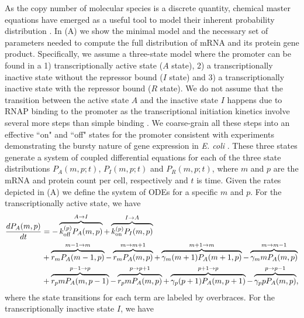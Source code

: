 As the copy number of molecular species is a discrete quantity, chemical master
equations have emerged as a useful tool to model their inherent probability
distribution \cite{Sanchez2013}. In (A) we show the
minimal model and the necessary set of parameters needed to compute the full
distribution of mRNA and its protein gene product. Specifically, we assume a
three-state model where the promoter can be found in a 1) transcriptionally
active state  ($A$ state), 2) a transcriptionally inactive state without the
repressor bound ($I$ state) and 3) a transcriptionally inactive state with the
repressor bound ($R$ state). We do not assume that the transition between the
active state $A$ and the inactive state $I$ happens due to RNAP binding to the
promoter as the transcriptional initiation kinetics involve several more steps
than simple binding \cite{Browning2004}. We coarse-grain all these steps into
an effective ``on" and ``off" states for the promoter consistent with
experiments demonstrating the bursty nature of gene expression in {\it E. coli}
\cite{Golding2005}. These three states generate a system of coupled
differential equations for each of the three state distributions $P_A(m, p;
t)$, $P_I(m, p; t)$ and $P_R(m, p; t)$, where $m$ and $p$ are the mRNA and
protein count per cell, respectively and $t$ is time. Given the rates depicted
in (A) we define the system of ODEs for a specific $m$
and $p$. For the transcriptionally active state, we have
\begin{equation}
  \begin{aligned}
    \dt{P_A(m, p)} &=
    - \overbrace{\kpoff P_A(m, p)}^{A \rightarrow I} %
    + \overbrace{\kpon P_I(m, p)}^{I \rightarrow A}\\ %
    &+ \overbrace{r_m P_A(m-1, p)}^{m-1 \rightarrow m} %
    - \overbrace{r_m P_A(m, p)}^{m \rightarrow m+1}%
    + \overbrace{\gm (m + 1) P_A(m+1 , p)}^{m+1 \rightarrow m} %
    - \overbrace{\gm m P_A(m , p)}^{m \rightarrow m-1}\\ %
    &+ \overbrace{r_p m P_A(m, p - 1)}^{p-1 \rightarrow p} %
    - \overbrace{r_p m P_A(m, p)}^{p \rightarrow p+1} %
    + \overbrace{\gp (p + 1) P_A(m, p + 1)}^{p + 1 \rightarrow p} %
    - \overbrace{\gp p P_A(m, p)}^{p \rightarrow p-1}, %
  \end{aligned}
\end{equation}
where the state transitions for each term are labeled by overbraces. For the
transcriptionally inactive state $I$, we have
